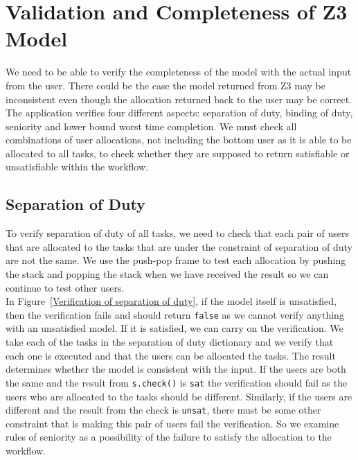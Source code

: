 \documentclass[a4paper]{report}
\begin{document}
\section{Validation and Completeness of Z3 Model}
We need to be able to verify the completeness of the model with the actual input from the user. There could be the case the model returned from Z3 may be inconsistent even though the allocation returned back to the user may be correct. The application verifies four different aspects: separation of duty, binding of duty, seniority and lower bound worst time completion. We must check all combinations of user allocations, not including the bottom user as it is able to be allocated to all tasks, to check whether they are supposed to return satisfiable or unsatisfiable within the workflow.\\

\subsection{Separation of Duty}
To verify separation of duty of all tasks, we need to check that each pair of users that are allocated to the tasks that are under the constraint of separation of duty are not the same. We use the push-pop frame to test each allocation by pushing the stack and popping the stack when we have received the result so we can continue to test other users. \\

In Figure~\ref{Verification of separation of duty}, if the model itself is unsatisfied, then the verification fails and should return \texttt{false} as we cannot verify anything with an unsatisfied model. If it is satisfied, we can carry on the verification. We take each of the tasks in the separation of duty dictionary and we verify that each one is executed and that the users can be allocated the tasks. The result determines whether the model is consistent with the input. If the users are both the same and the result from \texttt{s.check()} is \texttt{sat} the verification should fail as the users who are allocated to the tasks should be different. Similarly, if the users are different and the result from the check is \texttt{unsat}, there must be some other constraint that is making this pair of users fail the verification. So we examine rules of seniority as a possibility of the failure to satisfy the allocation to the workflow. 
\end{document}
